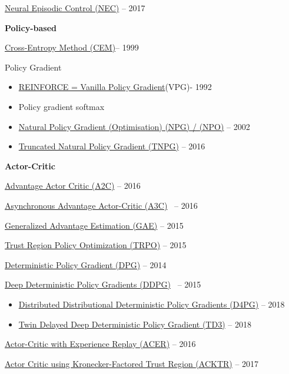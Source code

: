 \documentclass[
  a4paper,
  DIV=11,
  numbers=noendperiod]{scrreprt}
\providecommand{\tightlist}{%
  \setlength{\itemsep}{0pt}\setlength{\parskip}{0pt}}\usepackage{longtable,booktabs,array}
\begin{document}
\href{https://arxiv.org/abs/1703.01988}{Neural Episodic Control (NEC)}
-- 2017

\textbf{Policy-based}

\href{https://link.springer.com/article/10.1023/A:1010091220143}{Cross-Entropy
Method (CEM)}-- 1999

Policy Gradient

\begin{itemize}
\tightlist
\item
  \href{https://people.cs.umass.edu/~barto/courses/cs687/williams92simple.pdf}{REINFORCE
  = Vanilla Policy Gradient}(VPG)- 1992
\item
  Policy gradient softmax
\item
  \href{https://papers.nips.cc/paper/2073-a-natural-policy-gradient.pdf}{Natural
  Policy Gradient (Optimisation) (NPG) / (NPO)} -- 2002
\item
  \href{https://arxiv.org/abs/1604.06778}{Truncated Natural Policy
  Gradient (TNPG)} -- 2016
\end{itemize}

\textbf{Actor-Critic}

\href{https://arxiv.org/abs/1602.01783}{Advantage Actor Critic (A2C)} --
2016

\href{https://arxiv.org/abs/1602.01783}{Asynchronous Advantage
Actor-Critic (A3C)}~ -- 2016

\href{https://arxiv.org/abs/1506.02438}{Generalized Advantage Estimation
(GAE)} -- 2015

\href{https://arxiv.org/abs/1502.05477}{Trust Region Policy Optimization
(TRPO)} -- 2015

\href{http://proceedings.mlr.press/v32/silver14.pdf}{Deterministic
Policy Gradient (DPG)} -- 2014

\href{https://arxiv.org/abs/1509.02971}{Deep Deterministic Policy
Gradients (DDPG)}~ -- 2015

\begin{itemize}
\tightlist
\item
  \href{https://arxiv.org/abs/1804.08617}{Distributed Distributional
  Deterministic Policy Gradients (D4PG)} -- 2018
\item
  \href{https://arxiv.org/pdf/1802.09477.pdf}{Twin Delayed Deep
  Deterministic Policy Gradient (TD3)} -- 2018
\end{itemize}

\href{https://arxiv.org/abs/1611.01224}{Actor-Critic with Experience
Replay (ACER)} -- 2016

\href{https://arxiv.org/abs/1708.05144}{Actor Critic using
Kronecker-Factored Trust Region (ACKTR)} -- 2017
\end{document}
